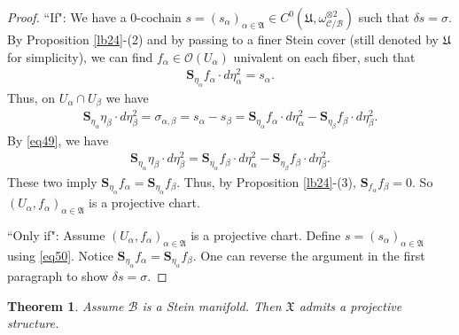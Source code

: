 \documentclass[11pt,b5paper,notitlepage]{article}
\theoremstyle{definition}
\theoremstyle{plain}
\newtheorem{thm}[df]{Theorem}
\newcommand{\fk}{\mathfrak}
\newcommand{\mc}{\mathcal}
\newcommand{\scr}{\mathscr}
\newcommand{\Sbf}{\mathbf{S}}
\numberwithin{equation}{section}
\begin{document}
\begin{proof}
	``If": We have a $0$-cochain $s=(s_\alpha)_{\alpha\in\fk A}\in C^0(\fk U,\omega_{\mc C/\mc B}^{\otimes 2})$ such that $\delta s=\sigma$. By Proposition \ref{lb24}-(2) and by passing to a finer Stein cover (still denoted by $\fk U$ for simplicity), we can find $f_\alpha\in\scr O(U_\alpha)$ univalent on each fiber, such that
	\begin{align}
	\Sbf_{\eta_\alpha}f_\alpha\cdot d\eta_\alpha^2=s_\alpha.\label{eq50}
	\end{align}
	Thus, on $U_\alpha\cap U_\beta$ we have
	\begin{align*}
	\Sbf_{\eta_\alpha}\eta_\beta\cdot d\eta_\beta^2=\sigma_{\alpha,\beta}=s_\alpha-s_\beta=\Sbf_{\eta_\alpha}f_\alpha\cdot d\eta_\alpha^2-\Sbf_{\eta_\beta}f_\beta\cdot d\eta_\beta^2.
	\end{align*}
	By \eqref{eq49}, we have
	\begin{align*}
	\Sbf_{\eta_\alpha}\eta_\beta\cdot d\eta_\beta^2=\Sbf_{\eta_\alpha}f_\beta\cdot d\eta_\alpha^2-\Sbf_{\eta_\beta}f_\beta\cdot d\eta_\beta^2.
	\end{align*}
	These two imply $\Sbf_{\eta_\alpha}f_\alpha=\Sbf_{\eta_\alpha}f_\beta$. Thus, by Proposition \ref{lb24}-(3), $\Sbf_{f_\alpha}f_\beta=0$. So $(U_\alpha,f_\alpha)_{\alpha\in\fk A}$ is a projective chart.
	
	``Only if": Assume $(U_\alpha,f_\alpha)_{\alpha\in\fk A}$ is a projective chart. Define $s=(s_\alpha)_{\alpha\in\fk A}$ using \eqref{eq50}. Notice $\Sbf_{\eta_\alpha}f_\alpha=\Sbf_{\eta_\alpha}f_\beta$. One can reverse the argument in the first paragraph to show $\delta s=\sigma$.
\end{proof}


\begin{thm}\label{lb40}
	Assume $\mc B$ is a Stein manifold. Then $\fk X$ admits a projective structure.
\end{thm}
\end{document}
